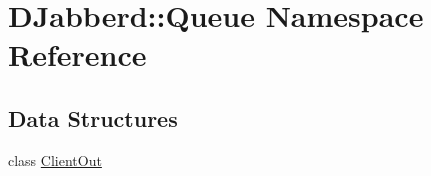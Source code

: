 \hypertarget{namespace_d_jabberd_1_1_queue}{
\section{\-D\-Jabberd\-:\-:\-Queue \-Namespace \-Reference}
\label{namespace_d_jabberd_1_1_queue}
}
\subsection*{\-Data \-Structures}
\begin{DoxyCompactItemize}
\item 
class \hyperlink{class_d_jabberd_1_1_queue_1_1_client_out}{\-Client\-Out}
\end{DoxyCompactItemize}
